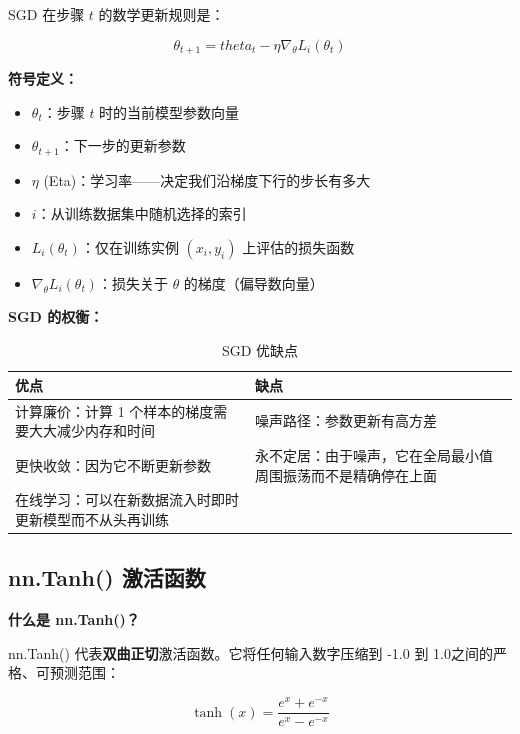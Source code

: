 \documentclass[12pt,a4paper]{article}
\theoremstyle{noteplain}
\theoremstyle{noteexercise}
\begin{document}
SGD 在步骤 $t$ 的数学更新规则是：

\begin{equation}\label{eq:sgd}
  \theta_{t+1} = theta_t - \eta \nabla_\theta L_i(\theta_t)
\end{equation}

\textbf{符号定义：}
\begin{itemize}
  \setlength{\itemsep}{0.2em}
  \item $\theta_t$：步骤 $t$ 时的当前模型参数向量
  \item $\theta_{t+1}$：下一步的更新参数
  \item $\eta$ (Eta)：学习率——决定我们沿梯度下行的步长有多大
  \item $i$：从训练数据集中随机选择的索引
  \item $L_i(\theta_t)$：仅在训练实例 $(x_i, y_i)$ 上评估的损失函数
  \item $\nabla_\theta L_i(\theta_t)$：损失关于 $\theta$ 的梯度（偏导数向量）
\end{itemize}

\textbf{SGD 的权衡：}

\begin{table}[H]
  \centering
  \caption{SGD 优缺点}
  \label{tab:sgd-tradeoff}
  \begin{tabular}{m{5cm}m{6cm}}
    \toprule
    \textbf{优点} & \textbf{缺点} \\
    \midrule
    计算廉价：计算 1 个样本的梯度需要大大减少内存和时间 &噪声路径：参数更新有高方差 \\
    \midrule
    更快收敛：因为它不断更新参数 &永不定居：由于噪声，它在全局最小值周围振荡而不是精确停在上面 \\
    \midrule
    在线学习：可以在新数据流入时即时更新模型而不从头再训练 & \\
    \bottomrule
  \end{tabular}
\end{table}

\subsection{nn.Tanh() 激活函数}

\textbf{什么是 nn.Tanh()？}

nn.Tanh() 代表\textbf{双曲正切}激活函数。它将任何输入数字压缩到 -1.0 到 1.0之间的严格、可预测范围：

\begin{equation}\label{eq:tanh}
  \tanh(x) = \frac{e^x + e^{-x}}{e^x - e^{-x}}
\end{equation}
\end{document}
